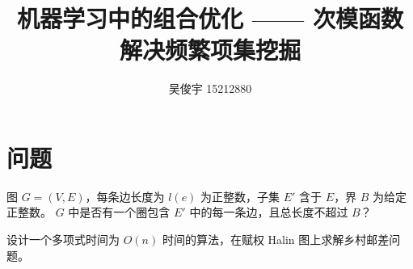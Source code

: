 \documentclass{ctexart}
\title{机器学习中的组合优化 —— 次模函数解决频繁项集挖掘}
\author{吴俊宇 15212880}
\begin{document}
\maketitle

\section{问题}

图 $G = (V, E)$，每条边长度为 $l(e)$ 为正整数，子集 $E'$ 含于 $E$，界 $B$ 为给定正整数。
$G$ 中是否有一个圈包含 $E'$ 中的每一条边，且总长度不超过 $B$？

设计一个多项式时间为 $O(n)$ 时间的算法，在赋权 Halin 图上求解乡村邮差问题。
\end{document}
